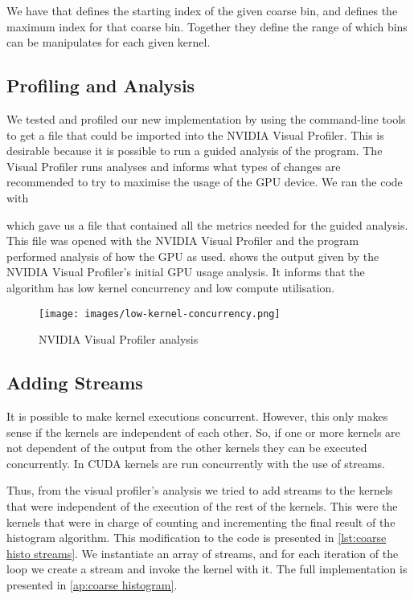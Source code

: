 We have that  defines the starting index of the given coarse bin, and  defines the maximum index for that coarse bin.
Together they define the range of which bins can be manipulates for each given kernel.

\subsection{Profiling and Analysis}

We tested and profiled our new implementation by using the  command-line tools to get a file that could be imported into the NVIDIA Visual Profiler.
This is desirable because it is possible to run a guided analysis of the program.
The Visual Profiler runs analyses and informs what types of changes are recommended to try to maximise the usage of the GPU device.
We ran the code with

\begin{quote}
\end{quote}

which gave us a file that contained all the metrics needed for the guided analysis.
This file was opened with the NVIDIA Visual Profiler and the program performed analysis of how the GPU as used.
 shows the output given by the NVIDIA Visual Profiler's initial GPU usage analysis.
It informs that the algorithm has low kernel concurrency and low compute utilisation.

\begin{figure}[htb]
  \centering
  \texttt{[image: images/low-kernel-concurrency.png]}
  \caption{NVIDIA Visual Profiler analysis}
  \label{fig:first impl}
\end{figure}

\subsection{Adding Streams}

It is possible to make kernel executions concurrent.
However, this only makes sense if the kernels are independent of each other.
So, if one or more kernels are not dependent of the output from the other kernels they can be executed concurrently.
In CUDA kernels are run concurrently with the use of streams.

Thus, from the visual profiler's analysis we tried to add streams to the kernels that were independent of the execution of the rest of the kernels.
This were the kernels that were in charge of counting and incrementing the final result of the histogram algorithm.
This modification to the code is presented in \cref{lst:coarse histo streams}.
We instantiate an array of streams, and for each iteration of the loop we create a stream and invoke the kernel with it.
The full implementation is presented in \cref{ap:coarse histogram}.

